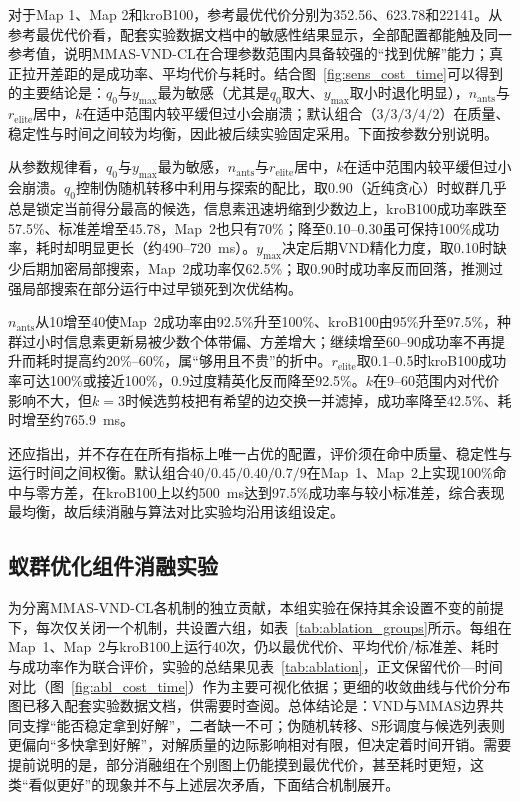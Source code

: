 \documentclass[lettersize,journal]{IEEEtran}
\begin{document}
对于Map 1、Map 2和kroB100，参考最优代价分别为352.56、623.78和22141。从参考最优代价看，配套实验数据文档中的敏感性结果显示，全部配置都能触及同一参考值，说明MMAS-VND-CL在合理参数范围内具备较强的“找到优解”能力；真正拉开差距的是成功率、平均代价与耗时。结合图~\textcolor{blue}{\ref{fig:sens_cost_time}}可以得到的主要结论是：$q_0$与$y_{\max}$最为敏感（尤其是$q_0$取大、$y_{\max}$取小时退化明显），$n_{\mathrm{ants}}$与$r_{\mathrm{elite}}$居中，$k$在适中范围内较平缓但过小会崩溃；默认组合（$3/3/3/4/2$）在质量、稳定性与时间之间较为均衡，因此被后续实验固定采用。下面按参数分别说明。

从参数规律看，$q_0$与$y_{\max}$最为敏感，$n_{\mathrm{ants}}$与$r_{\mathrm{elite}}$居中，$k$在适中范围内较平缓但过小会崩溃。$q_0$控制伪随机转移中利用与探索的配比，取0.90（近纯贪心）时蚁群几乎总是锁定当前得分最高的候选，信息素迅速坍缩到少数边上，kroB100成功率跌至57.5\%、标准差增至45.78，Map~2也只有70\%；降至0.10--0.30虽可保持100\%成功率，耗时却明显更长（约490--720~ms）。$y_{\max}$决定后期VND精化力度，取0.10时缺少后期加密局部搜索，Map~2成功率仅62.5\%；取0.90时成功率反而回落，推测过强局部搜索在部分运行中过早锁死到次优结构。

$n_{\mathrm{ants}}$从10增至40使Map~2成功率由92.5\%升至100\%、kroB100由95\%升至97.5\%，种群过小时信息素更新易被少数个体带偏、方差增大；继续增至60--90成功率不再提升而耗时提高约20\%--60\%，属“够用且不贵”的折中。$r_{\mathrm{elite}}$取0.1--0.5时kroB100成功率可达100\%或接近100\%，0.9过度精英化反而降至92.5\%。$k$在9--60范围内对代价影响不大，但$k=3$时候选剪枝把有希望的边交换一并滤掉，成功率降至42.5\%、耗时增至约765.9~ms。

还应指出，并不存在在所有指标上唯一占优的配置，评价须在命中质量、稳定性与运行时间之间权衡。默认组合$40/0.45/0.40/0.7/9$在Map~1、Map~2上实现100\%命中与零方差，在kroB100上以约500~ms达到97.5\%成功率与较小标准差，综合表现最均衡，故后续消融与算法对比实验均沿用该组设定。

\subsection{蚁群优化组件消融实验}

\label{subsec:exp_ablation}

为分离MMAS-VND-CL各机制的独立贡献，本组实验在保持其余设置不变的前提下，每次仅关闭一个机制，共设置六组，如表~\textcolor{blue}{\ref{tab:ablation_groups}}所示。每组在Map~1、Map~2与kroB100上运行40次，仍以最优代价、平均代价/标准差、耗时与成功率作为联合评价，实验的总结果见表~\textcolor{blue}{\ref{tab:ablation}}，正文保留代价—时间对比（图~\ref{fig:abl_cost_time}）作为主要可视化依据；更细的收敛曲线与代价分布图已移入配套实验数据文档，供需要时查阅。总体结论是：VND与MMAS边界共同支撑“能否稳定拿到好解”，二者缺一不可；伪随机转移、S形调度与候选列表则更偏向“多快拿到好解”，对解质量的边际影响相对有限，但决定着时间开销。需要提前说明的是，部分消融组在个别图上仍能摸到最优代价，甚至耗时更短，这类“看似更好”的现象并不与上述层次矛盾，下面结合机制展开。
\end{document}
